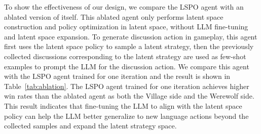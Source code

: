 To show the effectiveness of our design, we compare the LSPO agent with an ablated version of itself. This ablated agent only performs latent space construction and policy optimization in latent space, without LLM fine-tuning and latent space expansion. To generate discussion action in gameplay, this agent first uses the latent space policy to sample a latent strategy, then the previously collected discussions corresponding to the latent strategy are used as few-shot examples to prompt the LLM for the discussion action. We compare this agent with the LSPO agent trained for one iteration and the result is shown in Table~\ref{tab:ablation}. The LSPO agent trained for one iteration achieves higher win rates than the ablated agent as both the Village side and the Werewolf side. This result indicates that fine-tuning the LLM to align with the latent space policy can help the LLM better generalize to new language actions beyond the collected samples and expand the latent strategy space.

